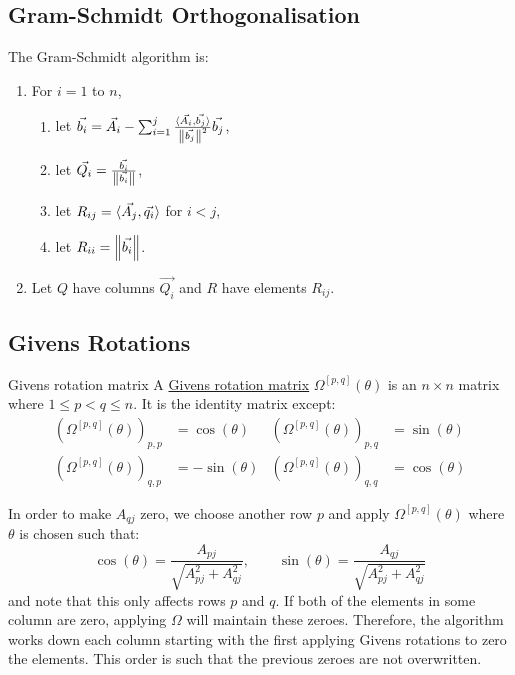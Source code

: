 \documentclass[../Main.tex]{subfiles}
\begin{document}
\subsection{Gram-Schmidt Orthogonalisation}
The Gram-Schmidt algorithm is:
\begin{enumerate}
    \item For $i = 1$ to $n$,
    \begin{enumerate}
        \item let $\vec{b_{i}} = \vec{A_i} - \sum_{i=1}^{j} \frac{\langle\vec{A_i},\vec{b_j}\rangle}{\left\|\vec{b_j}\right\|^2}\vec{b_j}$,
        \item let $\vec{Q_i} = \frac{\vec{b_i}}{\left\|\vec{b_i}\right\|}$,
        \item let $R_{ij} = \langle\vec{A_j},\vec{q_{i}}\rangle$ for $i < j$,
        \item let $R_{ii} = \left\|\vec{b_i}\right\|$.
    \end{enumerate}
    \item Let $Q$ have columns $\vec{Q_i}$ and $R$ have elements $R_{ij}$.
\end{enumerate}
\subsection{Givens Rotations}
\begin{definition}{Givens rotation matrix}
    A \underline{Givens rotation matrix} $\Omega^{[p, q]}(\theta)$ is an $n \times n$ matrix where $1 \leq p < q \leq n$. It is the identity matrix except:
    \begin{align*}
        (\Omega^{[p, q]}(\theta))_{p, p} &= \cos(\theta) & (\Omega^{[p, q]}(\theta))_{p, q} &= \sin(\theta) \\
        (\Omega^{[p, q]}(\theta))_{q, p} &= -\sin(\theta) & (\Omega^{[p, q]}(\theta))_{q, q} &= \cos(\theta)
    \end{align*}
\end{definition}
In order to make $A_{qj}$ zero, we choose another row $p$ and apply $\Omega^{[p, q]}(\theta)$ where $\theta$ is chosen such that:
\begin{equation*}
    \cos(\theta) = \frac{A_{pj}}{\sqrt{A_{pj}^2 + A_{qj}^2}},\qquad \sin(\theta) = \frac{A_{qj}}{\sqrt{A_{pj}^2 + A_{qj}^2}}
\end{equation*}
and note that this only affects rows $p$ and $q$. If both of the elements in some column are zero, applying $\Omega$ will maintain these zeroes. Therefore, the algorithm works down each column starting with the first applying Givens rotations to zero the elements. This order is such that the previous zeroes are not overwritten.
\end{document}
